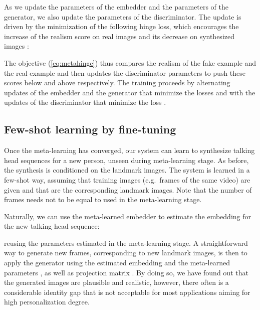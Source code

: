\documentclass[10pt,twocolumn,letterpaper]{article}
\newcommand{\eq}[1]{(\ref{eq:#1})}
\begin{document}
As we update the parameters  of the embedder and the parameters  of the generator, we also update the parameters  of the discriminator. The update is driven by the minimization of the following hinge loss, which encourages the increase of the realism score on real images  and its decrease on synthesized images :

The objective \eq{metahinge} thus compares the realism of the fake example  and the real example  and then updates the discriminator parameters to push these scores below  and above  respectively. The training proceeds by alternating updates of the embedder and the generator that minimize the losses  and  with the updates of the discriminator that minimize the loss .

\subsection{Few-shot learning by fine-tuning}

Once the meta-learning has converged, our system can learn to synthesize talking head sequences for a new person, unseen during meta-learning stage. As before, the synthesis is conditioned on the landmark images. The system is learned in a few-shot way, assuming that  training images  (e.g.\  frames of the same video) are given and that  are the corresponding landmark images. Note that the number of frames  needs not to be equal to  used in the meta-learning stage. 

Naturally, we can use the meta-learned embedder to estimate the embedding for the new talking head sequence:

reusing the parameters  estimated in the meta-learning stage. A straightforward way to generate new frames, corresponding to new landmark images, is then to apply the generator using the estimated embedding  and the meta-learned parameters , as well as projection matrix . By doing so, we have found out that the generated images are plausible and realistic, however, there often is a considerable identity gap that is not acceptable for most applications aiming for high personalization degree. 
\end{document}
